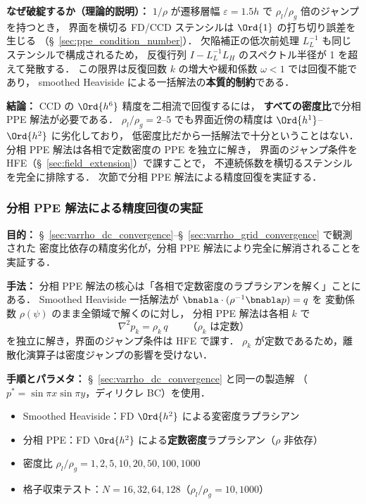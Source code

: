 \noindent\textbf{なぜ破綻するか（理論的説明）：}
$1/\rho$ が遷移層幅 $\varepsilon = 1.5h$ で $\rho_l/\rho_g$ 倍のジャンプを持つとき，
界面を横切る FD/CCD ステンシルは $\Ord{1}$ の打ち切り誤差を生じる
（§~\ref{sec:ppe_condition_number}）．
欠陥補正の低次前処理 $L_L^{-1}$ も同じステンシルで構成されるため，
反復行列 $I - L_L^{-1}L_H$ のスペクトル半径が 1 を超えて発散する．
この限界は反復回数 $k$ の増大や緩和係数 $\omega < 1$ では回復不能であり，
smoothed Heaviside による一括解法の\textbf{本質的制約}である．

\noindent\textbf{結論：}
CCD の $\Ord{h^6}$ 精度を二相流で回復するには，
\textbf{すべての密度比}で分相 PPE 解法が必要である．
$\rho_l/\rho_g = 2$--$5$ でも界面近傍の精度は $\Ord{h^{1}}$--$\Ord{h^{2}}$ に劣化しており，
低密度比だから一括解法で十分ということはない．
分相 PPE 解法は各相で定数密度の PPE を独立に解き，
界面のジャンプ条件を HFE（§~\ref{sec:field_extension}）で課すことで，
不連続係数を横切るステンシルを完全に排除する．
次節で分相 PPE 解法による精度回復を実証する．

\subsubsection{分相 PPE 解法による精度回復の実証}
\label{sec:split_ppe_recovery}
\label{sec:gfm_ppe_recovery}%

\noindent\textbf{目的：}
§~\ref{sec:varrho_dc_convergence}--§~\ref{sec:varrho_grid_convergence} で観測された
密度比依存の精度劣化が，分相 PPE 解法により完全に解消されることを実証する．

\noindent\textbf{手法：}
分相 PPE 解法の核心は「各相で定数密度のラプラシアンを解く」ことにある．
Smoothed Heaviside 一括解法が $\bnabla\cdot(\rho^{-1}\bnabla p) = q$ を
変動係数 $\rho(\psi)$ のまま全領域で解くのに対し，
分相 PPE 解法は各相 $k$ で
\begin{equation}
  \nabla^2 p_k = \rho_k \, q \qquad \text{（$\rho_k$ は定数）}
\end{equation}
を独立に解き，界面のジャンプ条件は HFE で課す．
$\rho_k$ が定数であるため，離散化演算子は密度ジャンプの影響を受けない．

\noindent\textbf{手順とパラメタ：}
§~\ref{sec:varrho_dc_convergence} と同一の製造解
（$p^* = \sin\pi x\sin\pi y$，ディリクレ BC）を使用．
\begin{itemize}[noitemsep]
  \item Smoothed Heaviside：FD $\Ord{h^2}$ による変密度ラプラシアン
  \item 分相 PPE：FD $\Ord{h^2}$ による\textbf{定数密度}ラプラシアン（$\rho$ 非依存）
  \item 密度比 $\rho_l/\rho_g = 1, 2, 5, 10, 20, 50, 100, 1000$
  \item 格子収束テスト：$N = 16, 32, 64, 128$（$\rho_l/\rho_g = 10, 1000$）
\end{itemize}

